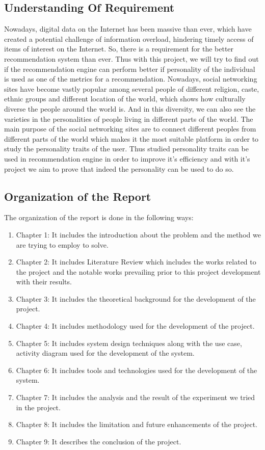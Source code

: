 \subsection{Understanding Of Requirement}
Nowadays, digital data on the Internet has been massive than ever, which have created a potential challenge of information overload, hindering timely access of items of interest on the Internet. So, there is a requirement for the better recommendation system than ever. Thus with this project, we will try to find out if the recommendation engine can perform better if personality of the individual is used as one of the metrics for a recommendation. Nowadays, social networking sites have become vastly popular among several people of different religion, caste, ethnic groups and different location of the world, which shows how culturally diverse the people around the world is. And in this diversity, we can also see the varieties in the personalities of people living in different parts of the world. The main purpose of the social networking sites are to connect different peoples from different parts of the world which makes it the most suitable platform in order to study the personality traits of the user. Thus studied personality traits can be used in recommendation engine in order to improve it's efficiency and with it's project we aim to prove that indeed the personality can be used to do so.

\subsection{Organization of the Report}
The organization of the report is done in the following ways:
\begin{enumerate}
\item Chapter 1: It includes the introduction about the problem and the method we are trying to employ to solve.
\item Chapter 2: It includes Literature Review which includes the works related to the project and the notable works prevailing prior to this project development with their results.
\item Chapter 3: It includes the theoretical background for the development of the project.
\item Chapter 4: It includes methodology used for the development of the project.
\item Chapter 5: It includes system design techniques along with the use case, activity diagram used for the development of the system.
\item Chapter 6: It includes tools and technologies used for the development of the system.
\item Chapter 7: It includes the analysis and the result of the experiment we tried in the project.
\item Chapter 8: It includes the limitation and future enhancements of the project.
\item Chapter 9: It describes the conclusion of the project.
\end{enumerate}
